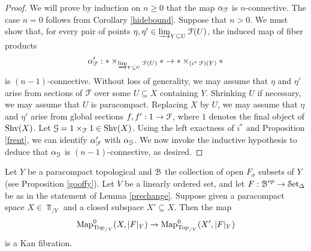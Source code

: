 \begin{proof}
We will prove by induction on $n \geq 0$ that the map $\alpha_{\operatorname{\mathcal{F}}}$ is $n$-connective. The case
$n=0$ follows from Corollary \ref{hidebound}. Suppose that $n > 0$. We must show that,
for every pair of points $\eta, \eta' \in \varinjlim_{Y \subseteq U} \operatorname{\mathcal{F}}(U)$, the induced map
of fiber products
$$ \alpha'_{\operatorname{\mathcal{F}}}: \ast \times_{ \varinjlim_{ Y \subseteq U} \operatorname{\mathcal{F}}(U) } \ast
\rightarrow \ast \times_{ (i^{\ast} \operatorname{\mathcal{F}})(Y)} \ast$$
is $(n-1)$-connective. Without loss of generality, we may assume that $\eta$ and $\eta'$
arise from sections of $\operatorname{\mathcal{F}}$ over some $U \subseteq X$ containing $Y$. Shrinking $U$ if necessary, we may assume that $U$ is paracompact. Replacing $X$ by $U$, we may assume that
$\eta$ and $\eta'$ arise from global sections $f,f': 1 \rightarrow \operatorname{\mathcal{F}}$, where $1$ denotes the final object of $\operatorname{Shv}(X)$. Let $\operatorname{\mathcal{G}} = 1 \times_{\operatorname{\mathcal{F}}} 1 \in \operatorname{Shv}(X)$. Using the left exactness of
$i^{\ast}$ and Proposition \ref{frent}, we can identify $\alpha'_{\operatorname{\mathcal{F}}}$ with $\alpha_{\operatorname{\mathcal{G}}}$.
We now invoke the inductive hypothesis to deduce that $\alpha_{\operatorname{\mathcal{G}}}$ is $(n-1)$-connective, as desired.
\end{proof}

\begin{lemma}\label{agint}
Let $Y$ be a paracompact topological and $\operatorname{\mathcal{B}}$ the collection of open $F_{\sigma}$ subsets of
$Y$ (see Proposition \ref{gooffy}). Let $V$ be a linearly ordered set, and let $F: \operatorname{\mathcal{B}}^{op} \rightarrow \operatorname{\mathcal{S}et_{\Delta}}$ be as in the statement of Lemma \ref{prechange}. Suppose given a paracompact space
$X \in \Top_{/Y}$ and a closed subspace $X' \subseteq X$. Then the map
$$ \operatorname{{Map}}^{0}_{ \operatorname{Top}_{/Y}}( X, |F|_Y) \rightarrow \operatorname{{Map}}^{0}_{ \operatorname{Top}_{/Y}}( X', |F|_{Y} )$$
is a Kan fibration.
\end{lemma}

